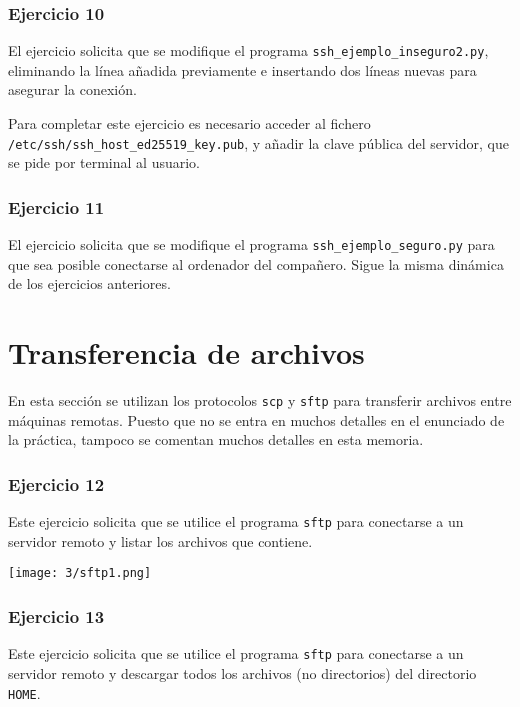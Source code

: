 \subsubsection{Ejercicio 10}
El ejercicio solicita que se modifique el programa \Verb#ssh_ejemplo_inseguro2.py#,
eliminando la línea añadida previamente e insertando dos líneas nuevas para asegurar la conexión.

Para completar este ejercicio es necesario acceder al fichero \\
\Verb#/etc/ssh/ssh_host_ed25519_key.pub#, y añadir la clave pública del servidor,
que se pide por terminal al usuario.

\subsubsection{Ejercicio 11}

El ejercicio solicita que se modifique el programa \Verb#ssh_ejemplo_seguro.py#
para que sea posible conectarse al ordenador del compañero. Sigue la misma dinámica
de los ejercicios anteriores.

\section{Transferencia de archivos}
En esta sección se utilizan los protocolos \Verb#scp# y \Verb#sftp# para transferir
archivos entre máquinas remotas. Puesto que no se entra en muchos detalles en el
enunciado de la práctica, tampoco se comentan muchos detalles en esta memoria.

\subsubsection{Ejercicio 12}
Este ejercicio solicita que se utilice el programa \Verb#sftp# para conectarse a un
servidor remoto y listar los archivos que contiene.

\begin{minipage}{\linewidth}
    \centering
    \texttt{[image: 3/sftp1.png]}
    \label{fig:3/13}
\end{minipage}

\subsubsection{Ejercicio 13}
Este ejercicio solicita que se utilice el programa \Verb#sftp# para conectarse a un
servidor remoto y descargar todos los archivos (no directorios) del directorio \Verb#HOME#.

